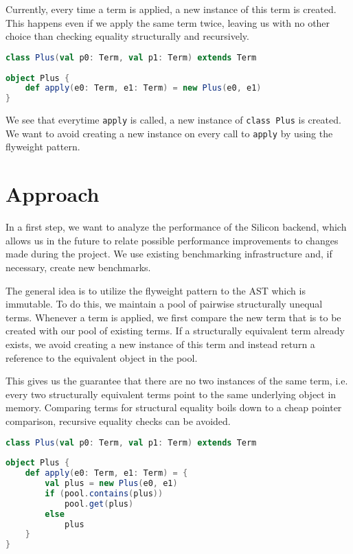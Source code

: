 \documentclass{article}
\begin{document}
    Currently, every time a term is applied, a new instance of this term is created.
    This happens even if we apply the same term twice, leaving us with no other choice
    than checking equality structurally and recursively. 

    \begin{lstlisting}[language=Scala, caption=How term instances currently are created.]
class Plus(val p0: Term, val p1: Term) extends Term
    
object Plus {
    def apply(e0: Term, e1: Term) = new Plus(e0, e1)
}
    \end{lstlisting}

    We see that everytime \texttt{apply} is called, a new instance of
    \texttt{class Plus} is created. We want to avoid creating a new instance on
    every call to \texttt{apply} by using the flyweight pattern.
  
    \section{Approach}
    In a first step, we want to analyze the performance of the Silicon backend,
    which allows us in the future to relate possible performance improvements to 
    changes made during the project. We use existing benchmarking infrastructure 
    and, if necessary, create new benchmarks.

    The general idea is to utilize the flyweight pattern to the AST which is immutable.
    To do this, we maintain a pool of pairwise structurally unequal terms. Whenever a term
    is applied, we first compare the new term that is to be created with our
    pool of existing terms. If a structurally equivalent term already exists, we
    avoid creating a new instance of this term and instead return a reference to the 
    equivalent object in the pool.

    This gives us the guarantee that there are no two instances of the
    same term, i.e. every two structurally equivalent terms point to the same
    underlying object in memory. Comparing terms for structural equality boils
    down to a cheap pointer comparison, recursive equality checks can be avoided.

    \begin{lstlisting}[language=Scala, caption=How a memory pool may be used to avoid creating structurally equivalent terms.]
class Plus(val p0: Term, val p1: Term) extends Term
    
object Plus {
    def apply(e0: Term, e1: Term) = {
        val plus = new Plus(e0, e1)
        if (pool.contains(plus))
            pool.get(plus)
        else
            plus
    }
}
    \end{lstlisting}
\end{document}

